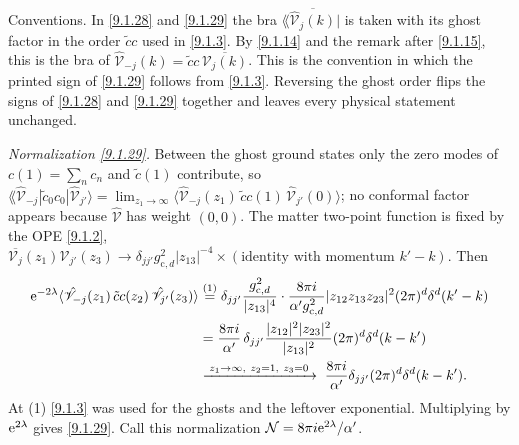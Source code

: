 \begin{tcolorbox}[breakable]
	\begin{remark}
		Conventions. In \eqref{9.1.28} and \eqref{9.1.29} the bra $\lAngle\overline{\hat{\mathscr V}_j(k)}|$ is taken with its ghost factor in the order $\tilde c c$ used in \eqref{9.1.3}. By \eqref{9.1.14} and the remark after \eqref{9.1.15}, this is the bra of $\hat{\mathscr V}_{-j}(k)=\tilde c c\,\overline{\mathscr V_j(k)}$. This is the convention in which the printed sign of \eqref{9.1.29} follows from \eqref{9.1.3}. Reversing the ghost order flips the signs of \eqref{9.1.28} and \eqref{9.1.29} together and leaves every physical statement unchanged.

		\emph{Normalization \eqref{9.1.29}.} Between the ghost ground states only the zero modes of $c(1)=\sum_n c_n$ and $\tilde c(1)$ contribute, so $\lAngle\hat{\mathscr V}_{-j}|\tilde c_0c_0|\hat{\mathscr V}_{j'}\rangle=\lim_{z_1\to\infty}\langle\hat{\mathscr V}_{-j}(z_1)\,\tilde c c(1)\,\hat{\mathscr V}_{j'}(0)\rangle$; no conformal factor appears because $\hat{\mathscr V}$ has weight $(0,0)$. The matter two-point function is fixed by the OPE \eqref{9.1.2}, $\overline{\mathscr V_j}(z_1)\mathscr V_{j'}(z_3)\to\delta_{jj'}g_{\mathrm c,d}^2|z_{13}|^{-4}\times(\text{identity with momentum }k'-k)$. Then
		\begin{align*}
			\me^{-2\lambda}\langle\hat{\mathscr V}_{-j}(z_1)\,\tilde c c(z_2)\,\hat{\mathscr V}_{j'}(z_3)\rangle
			&\eqs{1} \delta_{jj'}\frac{g_{\mathrm c,d}^2}{|z_{13}|^4}\cdot\frac{8\pi\mi}{\alpha' g_{\mathrm c,d}^2}|z_{12}z_{13}z_{23}|^2(2\pi)^d\delta^d(k'-k)\\
			&= \frac{8\pi\mi}{\alpha'}\,\delta_{jj'}\frac{|z_{12}|^2|z_{23}|^2}{|z_{13}|^2}(2\pi)^d\delta^d(k-k')\\
			&\xrightarrow{\;z_1\to\infty,\ z_2=1,\ z_3=0\;}\;\frac{8\pi\mi}{\alpha'}\delta_{jj'}(2\pi)^d\delta^d(k-k') .
		\end{align*}
		At (1) \eqref{9.1.3} was used for the ghosts and the leftover exponential. Multiplying by $\mathrm{e}^{2\lambda}$ gives \eqref{9.1.29}. Call this normalization $\mathcal N=8\pi i\mathrm{e}^{2\lambda}/\alpha'$.


\end{remark}
\end{tcolorbox}
